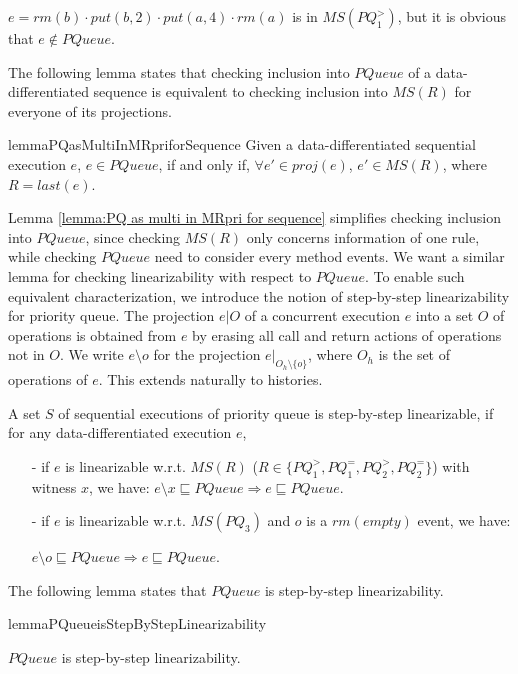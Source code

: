 \begin{example}\label{example:match set of R}
$e = \textit{rm}(b) \cdot \textit{put}(b,2) \cdot \textit{put}(a,4) \cdot \textit{rm}(a)$ is in $\textit{MS}(\textit{PQ}_1^{>} )$, but it is obvious that $e \notin \textit{PQueue}$.
\end{example}

The following lemma states that checking inclusion into $\textit{PQueue}$ of a data-differentiated sequence is equivalent to checking inclusion into $\textit{MS}(R)$ for everyone of its projections.

\begin{restatable}{lemma}{PQasMultiInMRpriforSequence}
\label{lemma:PQ as multi in MRpri for sequence}
Given a data-differentiated sequential execution $e$, $e \in \textit{PQueue}$, if and only if, $\forall e' \in \textit{proj}(e)$, $e' \in \textit{MS}(R)$, where $R = \textit{last}(e)$.
\end{restatable}

Lemma \ref{lemma:PQ as multi in MRpri for sequence} simplifies checking inclusion into $\textit{PQueue}$, since checking $\textit{MS}(R)$ only concerns information of one rule, while checking $\textit{PQueue}$ need to consider every method events. We want a similar lemma for checking linearizability with respect to $\textit{PQueue}$. To enable such equivalent characterization, we introduce the notion of step-by-step linearizability for priority queue. The projection $e \vert{O}$ of a concurrent execution $e$ into a set $O$ of operations is obtained from $e$ by erasing all call and return actions of operations not in $O$.  We write $e \setminus o$ for the projection $e \vert_{ O_h \setminus \{ o \} }$, where $O_h$ is the set of operations of $e$. This extends naturally to histories.

\begin{definition}\label{def:step-by-step linearizability of priority queue}
A set $S$ of sequential executions of priority queue is step-by-step linearizable, if for any data-differentiated execution $e$,
\begin{itemize}
\setlength{\itemsep}{0.5pt}
\item[-] if $e$ is linearizable w.r.t. $\textit{MS}(R)$ ($R \in \{ \textit{PQ}_1^{>}, \textit{PQ}_1^{=}, \textit{PQ}_2^{>},\textit{PQ}_2^{=} \}$) with witness $x$, we have: $e \setminus x \sqsubseteq \textit{PQueue} \Rightarrow e \sqsubseteq \textit{PQueue}$.

\item[-] if $e$ is linearizable w.r.t. $\textit{MS}(\textit{PQ}_3)$ and $o$ is a $\textit{rm}(\textit{empty})$ event, we have:

$e \setminus o \sqsubseteq \textit{PQueue} \Rightarrow e \sqsubseteq \textit{PQueue}$.
\end{itemize}
\end{definition}

The following lemma states that $\textit{PQueue}$ is step-by-step linearizability.

\begin{restatable}{lemma}{PQueueisStepByStepLinearizability}
\label{lemma:PQueue is step-by-step linearizability}

$\textit{PQueue}$ is step-by-step linearizability.

\end{restatable}